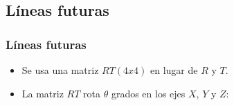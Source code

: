 \documentclass{beamer}
\begin{document}
\subsection{Líneas futuras}
\begin{frame}
	\frametitle{Líneas futuras}
	\begin{itemize}
	\item Se usa una matriz $RT (4x4)$ en lugar de $R$ y $T$.
	\item La matriz $RT$ rota $\theta$ grados en los ejes $X$, $Y$ y $Z$:
	\end{itemize}
\end{frame}

\begin{frame}[plain]
	\large{\titlepage}
\end{frame}
\end{document}
